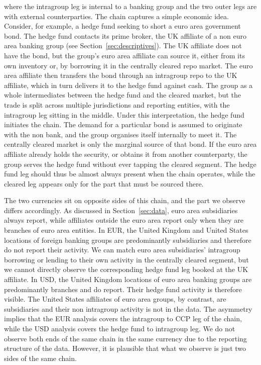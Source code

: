 \documentclass[english, 11pt, oneside, legal]{article}
\begin{document}
where the intragroup leg is internal to a banking group and the two outer legs are with external counterparties. The chain captures a simple economic idea. Consider, for example, a hedge fund seeking to short a euro area government bond. The hedge fund contacts its prime broker, the UK affiliate of a non euro area banking group (see Section~\ref{sec:descriptives}). The UK affiliate does not have the bond, but the group's euro area affiliate can source it, either from its own inventory or, by borrowing it in the centrally cleared repo market. The euro area affiliate then transfers the bond through an intragroup repo to the UK affiliate, which in turn delivers it to the hedge fund against cash. The group as a whole intermediates between the hedge fund and the cleared market, but the trade is split across multiple jurisdictions and reporting entities, with the intragroup leg sitting in the middle. Under this interpretation, the hedge fund initiates the chain. The demand for a particular bond is assumed to originate with the non bank, and the group organises itself internally to meet it. The centrally cleared market is only the marginal source of that bond. If the euro area affiliate already holds the security, or obtains it from another counterparty, the group serves the hedge fund without ever tapping the cleared segment. The hedge fund leg should thus be almost always present when the chain operates, while the cleared leg appears only for the part that must be sourced there.

The two currencies sit on opposite sides of this chain, and the part we observe differs accordingly. As discussed in Section~\ref{sec:data}, euro area subsidiaries always report, while affiliates outside the euro area report only when they are branches of euro area entities. In EUR, the United Kingdom and United States locations of foreign banking groups are predominantly subsidiaries and therefore do not report their activity. We can match euro area subsidiaries' intragroup borrowing or lending to their own activity in the centrally cleared segment, but we cannot directly observe the corresponding hedge fund leg booked at the UK affiliate. In USD, the United Kingdom locations of euro area banking groups are predominantly branches and do report. Their hedge fund activity is therefore visible. The United States affiliates of euro area groups, by contrast, are subsidiaries and their non intragroup activity is not in the data. The asymmetry implies that the EUR analysis covers the intragroup to CCP leg of the chain, while the USD analysis covers the hedge fund to intragroup leg. We do not observe both ends of the same chain in the same currency due to the reporting structure of the data. However, it is plausible that what we observe is just two sides of the same chain. 
\end{document}
